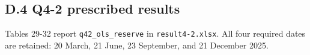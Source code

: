 \endgroup

\subsection*{D.4 Q4-2 prescribed results}\label{d.4-q4-2-prescribed-results}

Tables 29-32 report \nolinkurl{q42_ols_reserve} in \nolinkurl{result4-2.xlsx}. All four required dates are retained: 20 March, 21 June, 23 September, and 21 December 2025.

\Needspace{107.7pt}
\begingroup
\fontsize{8.3}{9.96}\selectfont
\setlength{\tabcolsep}{3.2pt}
\renewcommand{\arraystretch}{1.12}
\setlength{\LTleft}{0pt plus 1fill}\setlength{\LTright}{0pt plus 1fill}
\setlength{\LTcapwidth}{\linewidth}

